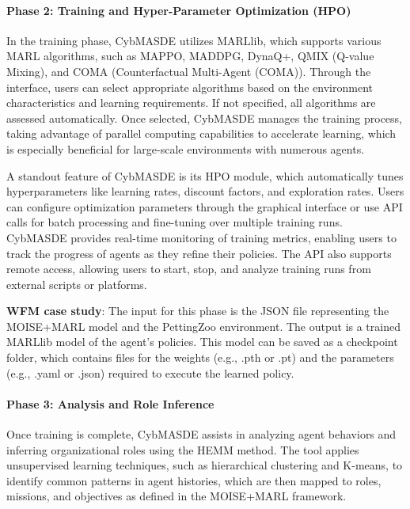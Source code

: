 \documentclass[sigconf,anonymous]{aamas}
\begin{document}
\paragraph{Phase 2: Training and Hyper-Parameter Optimization (HPO)}

In the training phase, CybMASDE utilizes MARLlib, which supports various MARL algorithms, such as MAPPO, MADDPG, DynaQ+, QMIX (Q-value Mixing), and COMA (Counterfactual Multi-Agent (COMA)). Through the interface, users can select appropriate algorithms based on the environment characteristics and learning requirements. If not specified, all algorithms are assessed automatically. Once selected, CybMASDE manages the training process, taking advantage of parallel computing capabilities to accelerate learning, which is especially beneficial for large-scale environments with numerous agents.

A standout feature of CybMASDE is its HPO module, which automatically tunes hyperparameters like learning rates, discount factors, and exploration rates. Users can configure optimization parameters through the graphical interface or use API calls for batch processing and fine-tuning over multiple training runs. CybMASDE provides real-time monitoring of training metrics, enabling users to track the progress of agents as they refine their policies. The API also supports remote access, allowing users to start, stop, and analyze training runs from external scripts or platforms.

\textbf{WFM case study}: The input for this phase is the JSON file representing the MOISE+MARL model and the PettingZoo environment. The output is a trained MARLlib model of the agent's policies. This model can be saved as a checkpoint folder, which contains files for the weights (e.g., .pth or .pt) and the parameters (e.g., .yaml or .json) required to execute the learned policy.

\paragraph{Phase 3: Analysis and Role Inference}

Once training is complete, CybMASDE assists in analyzing agent behaviors and inferring organizational roles using the HEMM method. The tool applies unsupervised learning techniques, such as hierarchical clustering and K-means, to identify common patterns in agent histories, which are then mapped to roles, missions, and objectives as defined in the MOISE+MARL framework.
\end{document}
